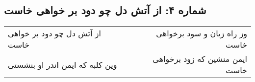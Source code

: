 \begin{center}
\section*{شماره ۴: از آتش دل چو دود بر خواهی خاست}
\label{sec:004}
\begin{longtable}{l p{0.5cm} r}
از آتش دل چو دود بر خواهی خاست
&&
وز راه زیان و سود برخواهی خاست
\\
وین کلبه که ایمن اندر او بنشستی
&&
ایمن منشین که زود برخواهی خاست
\\
\end{longtable}
\end{center}
